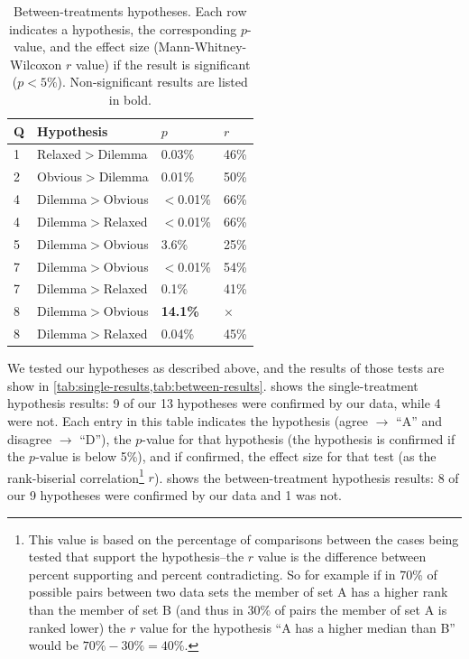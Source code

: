\begin{table}
\bgroup
\def\arraystretch{1.1}
\setlength{\tabcolsep}{0.7em}
\begin{tabular}{p{0.3em} | p{8em} | p{2.8em} | p{1.4em} |}
Q & Hypothesis & $p$ & $r$ \\
\hline
1  & Relaxed$>$Dilemma & 0.03\% & 46\% \\
\hline
2  & Obvious$>$Dilemma & 0.01\% & 50\% \\
\hline
4  & Dilemma$>$Obvious & $<$0.01\% & 66\% \\
\hline
4  & Dilemma$>$Relaxed & $<$0.01\% & 66\% \\
\hline
5  & Dilemma$>$Obvious & 3.6\% & 25\% \\
\hline
7  & Dilemma$>$Obvious & $<$0.01\% & 54\% \\
\hline
7  & Dilemma$>$Relaxed & 0.1\% & 41\% \\
\hline
8  & Dilemma$>$Obvious & \textbf{14.1\%} & $\times$ \\
\hline
8  & Dilemma$>$Relaxed & 0.04\% & 45\% \\
\hline
\end{tabular}
\egroup
  \caption{Between-treatments hypotheses. Each row indicates a hypothesis, the corresponding $p$-value, and the effect size (Mann-Whitney-Wilcoxon $r$ value) if the result is significant ($p < 5\%$). Non-significant results are listed in bold.}
  \label{tab:between-results}
\end{table}


We tested our hypotheses as described above, and the results of those tests are show in \cref{tab:single-results,tab:between-results}.
%
 shows the single-treatment hypothesis results: 9 of our 13 hypotheses were confirmed by our data, while 4 were not.
%
Each entry in this table indicates the hypothesis (agree $\rightarrow$ ``A'' and disagree $\rightarrow$ ``D''), the $p$-value for that hypothesis (the hypothesis is confirmed if the $p$-value is below 5\%), and if confirmed, the effect size for that test (as the rank-biserial correlation\footnote{This value is based on the percentage of comparisons between the cases being tested that support the hypothesis--the $r$ value is the difference between percent supporting and percent contradicting. So for example if in 70\% of possible pairs between two data sets the member of set A has a higher rank than the member of set B (and thus in 30\% of pairs the member of set A is ranked lower) the $r$ value for the hypothesis ``A has a higher median than B'' would be $70\% - 30\% = 40\%$.} $r$).
%
 shows the between-treatment hypothesis results: 8 of our 9 hypotheses were confirmed by our data and 1 was not.


